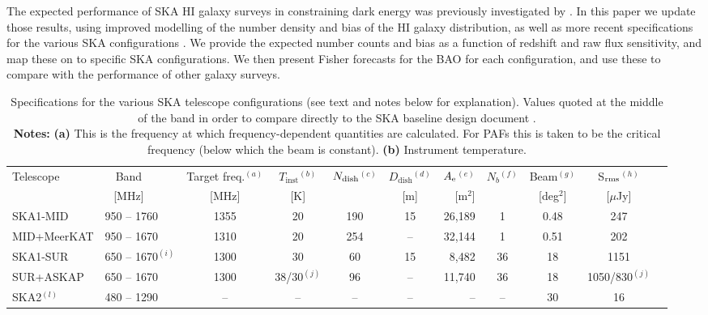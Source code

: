 \documentclass[useAMS,usenatbib]{mn2e}
\begin{document}
The expected performance of SKA HI galaxy surveys in constraining dark energy was previously investigated by \citet{Abdalla:2009wr}. In this paper we update those results, using improved modelling of the number density and bias of the HI galaxy distribution, as well as more recent specifications for the various SKA configurations \citep{aaska14}. We provide the expected number counts and bias as a function of redshift and raw flux sensitivity, and map these on to specific SKA configurations. We then present Fisher forecasts for the BAO for each configuration, and use these to compare with the performance of other galaxy surveys.

\begin{table}
\begin{center}
{\renewcommand{\arraystretch}{1.5}
\begin{tabular}{llccccrcccc}
\hline
\multirow{2}{*}{Telescope} & \multicolumn{1}{c}{Band~~~~} & {Target freq.$^{(a)}$} & {$T_\mathrm{inst}$$^{(b)}$} & {$N_{\rm dish}$$^{(c)}$} & $D_\mathrm{dish}$$^{(d)}$& $A_{\rm e}$$^{(e)}$ & {$N_b$$^{(f)}$} & Beam$^{(g)}$ & S$_{\rm rms}$$^{(h)}$\\
 & \multicolumn{1}{c}{[MHz]~~~~} & [MHz] & [K] & & [m] & [m$^2$] & & [deg$^2$] & [$\mu$Jy] \\
\hline
SKA1-MID & 950 -- 1760 & 1355 & 20 & 190 & 15 & 26,189 & 1 & 0.48 & 247\\
MID+MeerKAT & 950 -- 1670 & 1310 & 20 & 254 & -- & 32,144 & 1 & 0.51 & 202\\
SKA1-SUR  & 650 -- 1670$^{(i)}$ &  1300  & 30 & 60 & 15 & 8,482 & 36 & 18 & 1151\\
SUR+ASKAP & 650 -- 1670 & 1300 & 38/30$^{(j)}$ & 96 & -- & 11,740 & 36 & 18 & 1050/830$^{(j)}$\\
\hline
SKA2$^{(l)}$ & 480 -- 1290 & -- & -- & -- & -- & -- & -- & 30 & 16\\  
\hline
\end{tabular} }
\end{center}
\caption[x]{Specifications for the various SKA telescope configurations (see text and notes below for explanation). Values quoted at the middle of the band in order to compare directly to the SKA baseline design document \citep{dewdney2013ska1}.\\
{\bf Notes:} {\bf (a)} This is the frequency at which frequency-dependent quantities are calculated. For PAFs this is taken to be the critical frequency (below which the beam is constant).
{\bf (b)} Instrument temperature.
}
\end{table}
\end{document}
